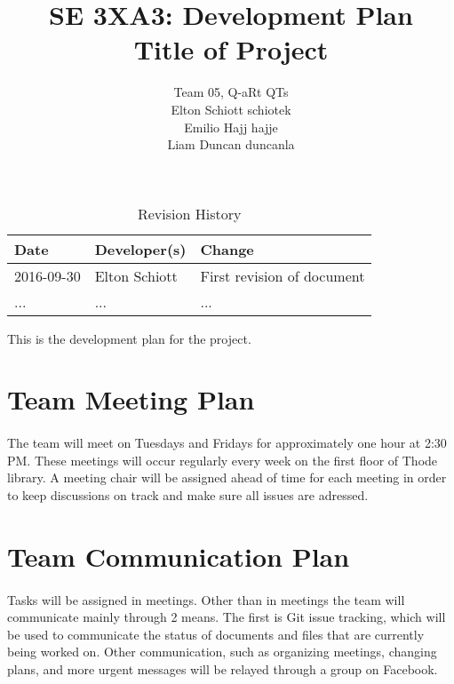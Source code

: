 \documentclass{article}
\title{SE 3XA3: Development Plan\\Title of Project}
\author{Team 05, Q-aRt QTs
		\\ Elton Schiott schiotek
		\\ Emilio Hajj hajje
		\\ Liam Duncan duncanla
}
\date{}
\begin{document}
\begin{table}[hp]
\caption{Revision History} \label{TblRevisionHistory}
\begin{tabularx}{\textwidth}{llX}
\toprule
\textbf{Date} & \textbf{Developer(s)} & \textbf{Change}\\
\midrule
2016-09-30 & Elton Schiott & First revision of document\\
... & ... & ...\\
\bottomrule
\end{tabularx}
\end{table}

\newpage

\maketitle

This is the development plan for the project.

\section{Team Meeting Plan}
	
	\paragraph{}
		
		The team will meet on Tuesdays and Fridays for approximately one hour 
		at 2:30 PM. These meetings will occur regularly every week on the first 
		floor of Thode library. A meeting chair will be assigned ahead of time 
		for each meeting in order to keep discussions on track and make sure 
		all issues are adressed.

\section{Team Communication Plan}
	
	\paragraph{}
	
		Tasks will be assigned in meetings. Other than in meetings the team 
		will communicate mainly through 2 means. The first is Git issue 
		tracking, which will be used to communicate the status of documents and 
		files that are currently being worked on. Other communication, such as 
		organizing meetings, changing plans, and more urgent messages will be 
		relayed through a group on Facebook.
\end{document}
